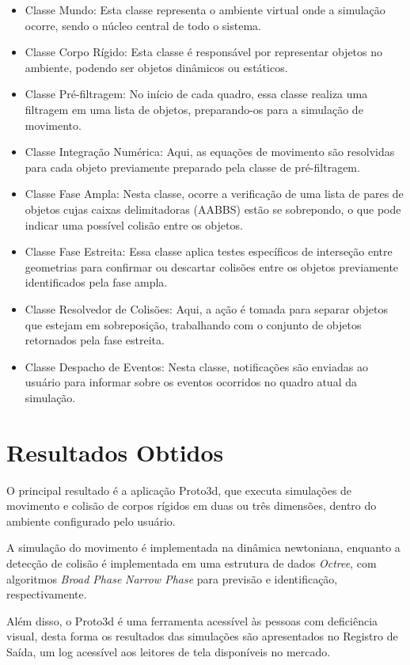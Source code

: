 \documentclass[12pt]{article}
\begin{document}
\begin{itemize}
\item Classe Mundo: Esta classe representa o ambiente virtual onde a simulação ocorre, sendo o núcleo central de todo o sistema.
\item Classe Corpo Rígido: Esta classe é responsável por representar objetos no ambiente, podendo ser objetos dinâmicos ou estáticos.
\item Classe Pré-filtragem: No início de cada quadro, essa classe realiza uma filtragem em uma lista de objetos, preparando-os para a simulação de movimento.
\item Classe Integração Numérica: Aqui, as equações de movimento são resolvidas para cada objeto previamente preparado pela classe de pré-filtragem.
\item Classe Fase Ampla: Nesta classe, ocorre a verificação de uma lista de pares de objetos cujas caixas delimitadoras (AABBS) estão se sobrepondo, o que pode indicar uma possível colisão entre os objetos.
\item Classe Fase Estreita: Essa classe aplica testes específicos de interseção entre geometrias para confirmar ou descartar colisões entre os objetos previamente identificados pela fase ampla.
\item Classe Resolvedor de Colisões: Aqui, a ação é tomada para separar objetos que estejam em sobreposição, trabalhando com o conjunto de objetos retornados pela fase estreita.
\item Classe Despacho de Eventos: Nesta classe, notificações são enviadas ao usuário para informar sobre os eventos ocorridos no quadro atual da simulação.
\end{itemize}

\section{Resultados Obtidos}
O principal resultado é a aplicação Proto3d, que executa simulações de movimento e colisão de corpos rígidos em duas ou três dimensões, dentro do ambiente configurado pelo usuário. 

A simulação do movimento é implementada na dinâmica newtoniana, enquanto a detecção de colisão é implementada em uma estrutura de dados \emph{Octree}, com algoritmos \emph{Broad Phase} \emph{Narrow Phase} para previsão e identificação, respectivamente.

Além disso, o Proto3d é uma ferramenta acessível às pessoas com deficiência visual, desta forma os resultados das simulações são apresentados no Registro de Saída, um log acessível aos leitores de tela disponíveis no mercado.
\end{document}
